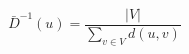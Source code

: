 \documentclass[12pt]{article}
\begin{document}
\[
\bar{D}^{-1}\left(u\right) =
    \frac{\left|V\right|}{\sum_{v \in V}{d\left(u,v\right)}}
\]
\end{document}
